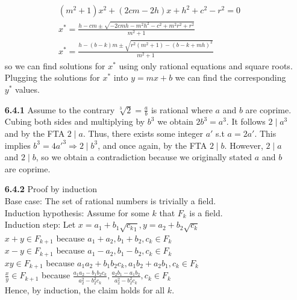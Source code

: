 \documentclass[10pt]{article}
\begin{document}
\begin{enumerate}
\begin{align*}
       (m^2+1)x^2+(2cm-2h)x+h^2+c^2-r^2=0\\
       x^*=\frac{h-cm\pm\sqrt{-2cmh-m^2h^2-c^2+m^2r^2+r^2}}{m^2+1}\\
       x^*=\frac{h-(b-k)m\pm\sqrt{r^2(m^2+1)-{(b-k+mh)}^2}}{m^2+1}
    \end{align*}
    so we can find solutions for $x^*$ using only rational equations and square roots.
    Plugging the solutions for $x^*$ into $y=mx+b$ we can find the corresponding $y^*$ values.
    \item [\textbf{6.4.1}] Assume to the contrary $\sqrt[3]{2}=\frac{a}{b}$ is rational where $a$ and $b$ are coprime. 
    Cubing both sides and multiplying by $b^3$ we obtain $2b^3=a^3$. 
    It follows $2\mid a^3$ and by the FTA $2\mid a$. Thus, there exists some integer $a'$ s.t $a=2a'$.
    This implies $b^3=4{a'}^3\Rightarrow 2\mid b^3$, and once again, by the FTA $2\mid b$.
    However, $2\mid a$ and $2\mid b$, so we obtain a contradiction because we originally stated $a$ and $b$ are coprime.
    \item [\textbf{6.4.2}] Proof by induction\\
    Base case: The set of rational numbers is trivially a field.\\
    Induction hypothesis: Assume for some $k$ that $F_k$ is a field.\\
    Induction step: Let $x=a_1+b_1\sqrt{{c_k}_1},y=a_2+b_2\sqrt{c_k}$\\
    $x+y\in F_{k+1}$ because $a_1+a_2,b_1+b_2,c_k\in F_k$\\
    $x-y\in F_{k+1}$ because $a_1-a_2,b_1-b_2,c_k\in F_k$\\
    $xy\in F_{k+1}$ because $a_1a_2+b_1b_2c_k,a_1b_2+a_2b_1,c_k\in F_k$\\
    $\frac{x}{y}\in F_{k+1}$ because $\frac{a_1a_2-b_1b_2c_k}{a_2^2-b_2^2c_k},\frac{a_2b_1-a_1b_2}{a_2^2-b_2^2c_k},c_k\in F_k$\\
    Hence, by induction, the claim holds for all $k$.
\end{enumerate}
\end{document}
